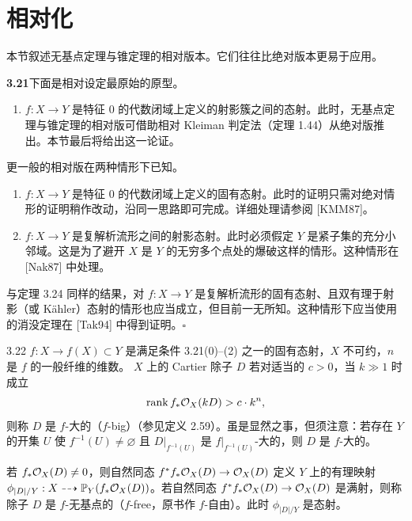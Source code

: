 \section{相对化}

本节叙述无基点定理与锥定理的相对版本。它们往往比绝对版本更易于应用。

\par\medskip\noindent\textbf{3.21}\quad 下面是相对设定最原始的原型。
\begin{enumerate}[label=（\arabic*）,leftmargin=2.8em,itemsep=1pt,topsep=2pt,parsep=0pt,start=0]
\item $f:X\to Y$ 是特征 $0$ 的代数闭域上定义的射影簇之间的态射。此时，无基点定理与锥定理的相对版可借助相对 Kleiman 判定法（定理 1.44）从绝对版推出。本节最后将给出这一论证。
\end{enumerate}
更一般的相对版在两种情形下已知。
\begin{enumerate}[label=（\arabic*）,leftmargin=2.8em,itemsep=1pt,topsep=2pt,parsep=0pt,start=1]
\item $f:X\to Y$ 是特征 $0$ 的代数闭域上定义的固有态射。此时的证明只需对绝对情形的证明稍作改动，沿同一思路即可完成。详细处理请参阅 [KMM87]。
\item $f:X\to Y$ 是复解析流形之间的射影态射。此时必须假定 $Y$ 是紧子集的充分小邻域。这是为了避开 $X$ 是 $Y$ 的无穷多个点处的爆破这样的情形。这种情形在 [Nak87] 中处理。
\end{enumerate}
与定理 3.24 同样的结果，对 $f:X\to Y$ 是复解析流形的固有态射、且双有理于射影（或 Kähler）态射的情形也应当成立，但目前一无所知。这种情形下应当使用的消没定理在 [Tak94] 中得到证明。\hfill$\square$

\begin{definition}{3.22}
$f:X\to f(X)\subset Y$ 是满足条件 3.21(0)--(2) 之一的固有态射，$X$ 不可约，$n$ 是 $f$ 的一般纤维的维数。
$X$ 上的 Cartier 除子 $D$ 若对适当的 $c>0$，当 $k\gg 1$ 时成立
\[
\operatorname{rank} f_*\mathcal{O}_X(kD)>c\cdot k^n,
\]
则称 $D$ 是 $f$-大的（$f$-big）（参见定义 2.59）。虽是显然之事，但须注意：若存在 $Y$ 的开集 $U$ 使 $f^{-1}(U)\neq\varnothing$ 且 $D|_{f^{-1}(U)}$ 是 $f|_{f^{-1}(U)}$-大的，则 $D$ 是 $f$-大的。

若 $f_*\mathcal{O}_X(D)\neq 0$，则自然同态 $f^*f_*\mathcal{O}_X(D)\to\mathcal{O}_X(D)$ 定义 $Y$ 上的有理映射 $\phi_{|D|/Y}:X\dashrightarrow\mathbb{P}_Y(f_*\mathcal{O}_X(D))$。若自然同态 $f^*f_*\mathcal{O}_X(D)\to\mathcal{O}_X(D)$ 是满射，则称除子 $D$ 是 $f$-无基点的（$f$-free，原书作 $f$-自由）。此时 $\phi_{|D|/Y}$ 是态射。
\end{definition}

